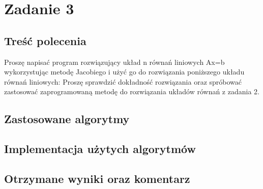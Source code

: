 \documentclass[11pt]{article} %
\begin{document}
\section{Zadanie 3}

\subsection{Treść polecenia}

Proszę napisać program rozwiązujący układ n równań liniowych Ax=b wykorzystując metodę Jacobiego i użyć go do rozwiązania poniższego układu równań liniowych:
Proszę sprawdzić dokładność rozwiązania oraz spróbować zastosować zaprogramowaną metodę do rozwiązania układów równań z zadania 2.

\subsection{Zastosowane algorytmy}

\subsection{Implementacja użytych algorytmów}

\subsection{Otrzymane wyniki oraz komentarz}
\end{document}
